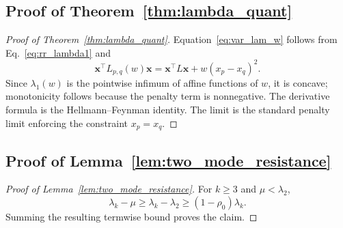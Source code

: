 \documentclass[11pt]{article}
\numberwithin{equation}{section}
\theoremstyle{definition}
\theoremstyle{remark}
\begin{document}
\subsection{Proof of Theorem~\ref{thm:lambda_quant}}
\begin{proof}[Proof of Theorem~\ref{thm:lambda_quant}]
	Equation~\eqref{eq:var_lam_w} follows from Eq.~\eqref{eq:rr_lambda1} and
	\[
	\boldsymbol{x}^\top L_{p,q}(w)\boldsymbol{x}
	=
	\boldsymbol{x}^\top L\boldsymbol{x}+w(x_p-x_q)^2.
	\]
	Since $\lambda_1(w)$ is the pointwise infimum of affine functions of
	$w$, it is concave; monotonicity follows because the penalty term is
	nonnegative. The derivative formula is the Hellmann--Feynman identity.
	The limit is the standard penalty limit enforcing the constraint
	$x_p=x_q$.
\end{proof}

\subsection{Proof of Lemma~\ref{lem:two_mode_resistance}}
\begin{proof}[Proof of Lemma~\ref{lem:two_mode_resistance}]
	For $k\ge 3$ and $\mu<\lambda_2$,
	\[
	\lambda_k-\mu\ge \lambda_k-\lambda_2\ge (1-\rho_0)\lambda_k.
	\]
	Summing the resulting termwise bound proves the claim.
\end{proof}
\end{document}
